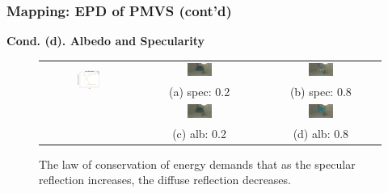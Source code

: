 \documentclass{beamer}
\begin{document}
\begin{frame}
\frametitle{Mapping: EPD of PMVS (cont'd)}

\textbf{Cond. (d). Albedo and Specularity}
\begin{figure}
\centering
\begin{tabular}{ccc}
\multirow{2}{*}{
  \includegraphics[width=0.25\textwidth]{mapping/depend_check/mvs_alb_spec}
  }
&
\includegraphics[width=0.22\textwidth]{mapping/mvs_alb_spec/alb_spec_0202}&
\includegraphics[width=0.22\textwidth]{mapping/mvs_alb_spec/alb_spec_0208}\\
& (a) spec: 0.2 & (b) spec: 0.8\\
&
\includegraphics[width=0.22\textwidth]{mapping/mvs_alb_spec/alb_spec_0202}&
\includegraphics[width=0.22\textwidth]{mapping/mvs_alb_spec/alb_spec_0802}\\
& (c) alb: 0.2 & (d) alb: 0.8\\
\end{tabular}
\caption{The law of conservation of energy demands that as the specular reflection increases, the diffuse reflection decreases.}
\end{figure}

\end{frame}
\end{document}
